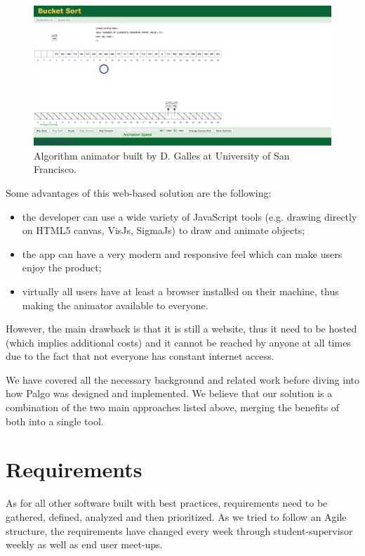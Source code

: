 \documentclass{l4proj}
\begin{document}
\begin{figure}[!ht]
\centering
\includegraphics[scale=0.25]{galles}
\caption{Algorithm animator built by D. Galles at University of San Francisco.}
\label{fig:galles}
\end{figure}

Some advantages of this web-based solution are the following:
\begin{itemize}
\item the developer can use a wide variety of JavaScript tools (e.g. drawing directly on HTML5 canvas, VisJs, SigmaJs)
  to draw and animate objects;
\item the app can have a very modern and responsive feel which can make users enjoy the product;
\item virtually all users have at least a browser installed on their machine, thus making the animator available to
  everyone.
\end{itemize}

However, the main drawback is that it is still a website, thus it need to be hosted (which implies additional costs) and it cannot be reached by anyone at all times due to the fact that not everyone has constant internet access.

We have covered all the necessary background and related work before diving into how Palgo was designed and implemented. We believe that our solution is a combination of the two main approaches listed above, merging the benefits of both into a single tool.


\chapter{Requirements}
\label{requirements}

As for all other software built with best practices, requirements need to be gathered, defined, analyzed and then prioritized. As we tried to follow an Agile structure, the requirements have changed every week through student-supervisor weekly as well as end user meet-ups.
\end{document}
